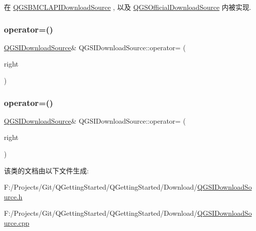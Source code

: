在 \mbox{\hyperlink{class_q_g_s_b_m_c_l_a_p_i_download_source_af14aa10eab10f0842238f924196a9e14}{Q\+G\+S\+B\+M\+C\+L\+A\+P\+I\+Download\+Source}} , 以及 \mbox{\hyperlink{class_q_g_s_official_download_source_a32b22d324a98de1863d1da57066f4ac1}{Q\+G\+S\+Official\+Download\+Source}} 内被实现.

\mbox{\label{class_q_g_s_i_download_source_ab8c145193be186e9c1385406d904010c}} 
\subsubsection{\texorpdfstring{operator=()}{operator=()}\hspace{0.1cm}{\footnotesize\ttfamily [1/2]}}
{\footnotesize\ttfamily \mbox{\hyperlink{class_q_g_s_i_download_source}{Q\+G\+S\+I\+Download\+Source}}\& Q\+G\+S\+I\+Download\+Source\+::operator= (\begin{DoxyParamCaption}\item[{const \mbox{\hyperlink{class_q_g_s_i_download_source}{Q\+G\+S\+I\+Download\+Source}} \&}]{right }\end{DoxyParamCaption})\hspace{0.3cm}{\ttfamily [delete]}}

\mbox{\label{class_q_g_s_i_download_source_a78083cae9e279c9eadde7aeb028358d8}} 
\subsubsection{\texorpdfstring{operator=()}{operator=()}\hspace{0.1cm}{\footnotesize\ttfamily [2/2]}}
{\footnotesize\ttfamily \mbox{\hyperlink{class_q_g_s_i_download_source}{Q\+G\+S\+I\+Download\+Source}}\& Q\+G\+S\+I\+Download\+Source\+::operator= (\begin{DoxyParamCaption}\item[{\mbox{\hyperlink{class_q_g_s_i_download_source}{Q\+G\+S\+I\+Download\+Source}} \&\&}]{right }\end{DoxyParamCaption})\hspace{0.3cm}{\ttfamily [delete]}}



该类的文档由以下文件生成\+:\begin{DoxyCompactItemize}
\item 
F\+:/\+Projects/\+Git/\+Q\+Getting\+Started/\+Q\+Getting\+Started/\+Download/\mbox{\hyperlink{_q_g_s_i_download_source_8h}{Q\+G\+S\+I\+Download\+Source.\+h}}\item 
F\+:/\+Projects/\+Git/\+Q\+Getting\+Started/\+Q\+Getting\+Started/\+Download/\mbox{\hyperlink{_q_g_s_i_download_source_8cpp}{Q\+G\+S\+I\+Download\+Source.\+cpp}}\end{DoxyCompactItemize}
